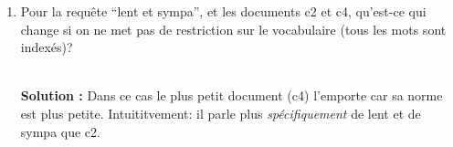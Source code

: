 \documentclass[10pt,a4paper]{article}
\newenvironment{solution}[0]{
~\\ \color{red} \textbf{Solution : }\color{black}}{%
}
\begin{document}
\begin{enumerate}
\begin{solution}
\begin{itemize}
  \item bavard\,: c1 : $\frac{1}{\sqrt{2}}$;  
       c4 : $\frac{1}{\sqrt{3}}$; 
       c5 : $\frac{2}{\sqrt{6}}$; 
  
  \item lent et sympa\,: 
  
    c2 : $\frac{1+1}{\sqrt{3}}$; 
    c4 :  $\frac{1+1}{\sqrt{3}}$  
    c5 : $\frac{1}{\sqrt{6}}$; 

  \item dangereux et bavard
  
    c1 : $\frac{1+1}{\sqrt{2}}$; 
    c2 : $\frac{1}{\sqrt{3}}$;
    c3 :  $\frac{2}{\sqrt{3}}$  
    c4 :  $\frac{1}{\sqrt{3}}$  
    c5 : $\frac{1+2}{\sqrt{6}}$; 
    
 \end{itemize}

\end{solution}  

   \item Pour la requête ``lent et sympa'', et les documents c2 et c4,
   qu'est-ce qui change si on ne met pas de restriction 
   sur le vocabulaire (tous les mots sont indexés)?
   
\begin{solution}
Dans ce cas le plus petit document (c4) l'emporte car sa norme est
plus petite. Intuititvement: il parle plus \emph{spécifiquement} de
lent et de sympa que c2.
\end{solution}   
    

\end{enumerate}
\end{document}
